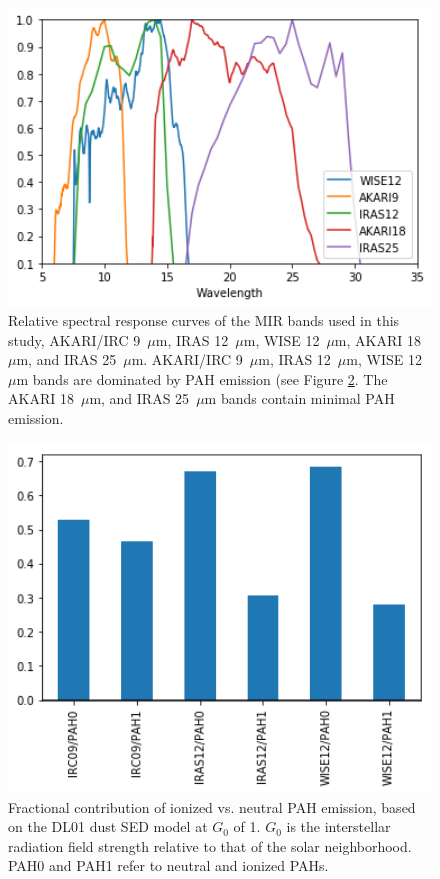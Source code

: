 \documentclass[preprint2,longabstract]{aastex}
\begin{document}
     \begin{figure}
     \label{fig:relSpectralResponse_MIR}
     \centering
     \includegraphics[width=150mm]{../Plots/RelSpectralResponse_MIR.png}
     \caption{Relative spectral response curves of the MIR bands used in this study, AKARI/IRC 9~$\mu$m, IRAS 12~$\mu$m, WISE 12~$\mu$m, AKARI 18~$\mu$m, and  IRAS 25~$\mu$m. AKARI/IRC 9~$\mu$m, IRAS 12~$\mu$m, WISE 12~$\mu$m bands are dominated by PAH emission (see Figure \ref{fig:inband_ionfrac_bar}. The AKARI 18~$\mu$m, and  IRAS 25~$\mu$m bands contain minimal PAH emission. }
     \end{figure}

     \begin{figure}
     \label{fig:inband_ionfrac_bar}
     \centering
     \includegraphics[width=150mm]{../Plots/InBandContribution_PAH_bar.png}
     \caption{Fractional contribution of ionized vs. neutral PAH emission, based on the DL01 dust SED model at $G_{0}$ of 1. $G_{0}$ is the interstellar radiation field strength relative to that of the solar neighborhood. PAH0 and PAH1 refer to neutral and ionized PAHs. }
     \end{figure}
\end{document}

